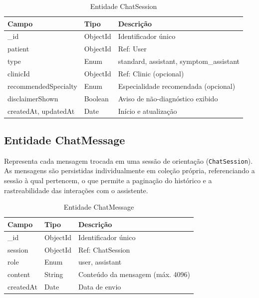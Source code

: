 \begin{table}[H]
  \centering
  \caption{Entidade ChatSession}
  \label{tab:entity-chat}
  \begin{tabular}{p{3.8cm}p{2.5cm}p{5.2cm}}
    \toprule
    \textbf{Campo} &
    \textbf{Tipo} &
    \textbf{Descrição} \\
    \midrule
    \_id                 & ObjectId & Identificador único \\
    patient              & ObjectId & Ref: User \\
    type                 & Enum     & standard, assistant,
                                      symptom\_assistant \\
    clinicId             & ObjectId & Ref: Clinic (opcional) \\
    recommendedSpecialty & Enum     & Especialidade recomendada
                                      (opcional) \\
    disclaimerShown      & Boolean  & Aviso de não-diagnóstico exibido \\
    createdAt, updatedAt & Date     & Início e atualização \\
    \bottomrule
  \end{tabular}
\end{table}

\subsection{Entidade ChatMessage}
\label{subsec:entity-chat-message}

Representa cada mensagem trocada em uma sessão de
orientação (\texttt{ChatSession}). As mensagens são
persistidas individualmente em coleção própria,
referenciando a sessão à qual pertencem, o que
permite a paginação do histórico e a rastreabilidade
das interações com o assistente.

\begin{table}[H]
  \centering
  \caption{Entidade ChatMessage}
  \label{tab:entity-chat-message}
  \begin{tabular}{p{3.8cm}p{2.5cm}p{5.2cm}}
    \toprule
    \textbf{Campo} &
    \textbf{Tipo} &
    \textbf{Descrição} \\
    \midrule
    \_id       & ObjectId & Identificador único \\
    session    & ObjectId & Ref: ChatSession \\
    role       & Enum     & user, assistant \\
    content    & String   & Conteúdo da mensagem (máx. 4096) \\
    createdAt  & Date     & Data de envio \\
    \bottomrule
  \end{tabular}
\end{table}

